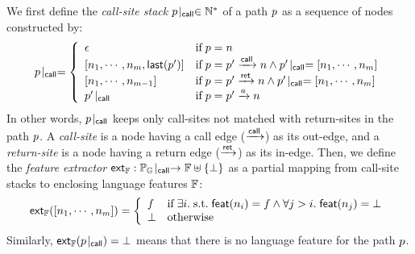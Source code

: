 We first define the \textit{call-site stack} ${p}\!\mid_{\textsf{call}} \in \mathbb{N}^*$ of a
path $p$ as a sequence of nodes constructed by:
\begin{equation}\label{equ:css}
  {p}\!\mid_{\textsf{call}} = \left\{
    \begin{array}{ll}
      \epsilon &
      \text{if} \; p = n\\

      {[n_1, \cdots, n_m, \textsf{last}(p')]} &
      \text{if} \; p = p' \xrightarrow{\textsf{call}} n \wedge
      {p'}\!\mid_{\textsf{call}} = [n_1, \cdots, n_m]\\

      {[n_1, \cdots, n_{m-1}]} &
      \text{if} \; p = p' \xrightarrow{\textsf{ret}} n \wedge
      {p'}\!\mid_{\textsf{call}} = [n_1, \cdots, n_m]\\

      {p'}\!\mid_{\textsf{call}} &
      \text{if} \; p = p' \xrightarrow{a} n

    \end{array}
  \right.
\end{equation}
In other words, ${p}\!\mid_{\textsf{call}}$ keeps only call-sites not matched with return-sites
in the path $p$.  A \textit{call-site} is a node having a call edge ($\xrightarrow{\textsf{call}}$)
as its out-edge, and a \textit{return-site} is a node having a return edge
($\xrightarrow{\textsf{ret}}$) as its in-edge.
%
Then, we define the \textit{feature extractor} $\textsf{ext}_{\mathbb{F}}: {\mathbb{P}_{\mathbb{G}}}\!\mid_{\textsf{call}}
\rightarrow \mathbb{F} \uplus \{ \bot \}$ as a partial mapping from call-site
stacks to enclosing language features $\mathbb{F}$:
\begin{equation}\label{equ:extfeat}
  \textsf{ext}_{\mathbb{F}}([n_1, \cdots, n_m]) = \left\{
    \begin{array}{ll}
      f & \text{if} \;
      \exists i. {\; \text{s.t.} \; } \textsf{feat}(n_i) = f \wedge
      \forall j > i. \; \textsf{feat}(n_j) = \bot
      \\

      \bot & \text{otherwise}
    \end{array}
  \right.
\end{equation}
%
Similarly, $\textsf{ext}_{\mathbb{F}}({p}\!\mid_{\textsf{call}}) = \bot$ means that there is no language feature
for the path $p$.


